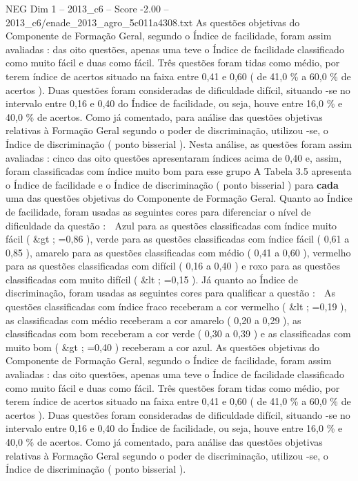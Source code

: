 \begin{textsample}{NEG Dim 1 – 2013\_c6 – Score -2.00 – 2013\_c6/enade\_2013\_agro\_5c011a4308.txt}
As questões objetivas do Componente de Formação Geral, segundo o Índice de facilidade, foram assim avaliadas : das oito questões, apenas uma teve o Índice de facilidade classificado como muito fácil e duas como fácil.
Três questões foram tidas como médio, por terem índice de acertos situado na faixa entre 0,41 e 0,60 ( de 41,0 \% a 60,0 \% de acertos ).
Duas questões foram consideradas de dificuldade difícil, situando -se no intervalo entre 0,16 e 0,40 do Índice de facilidade, ou seja, houve entre 16,0 \% e 40,0 \% de acertos.
Como já comentado, para análise das questões objetivas relativas à Formação Geral segundo o poder de discriminação, utilizou -se, o Índice de discriminação ( ponto bisserial ).
Nesta análise, as questões foram assim avaliadas : cinco das oito questões apresentaram índices acima de 0,40 e, assim, foram classificadas com índice muito bom para esse grupo A Tabela 3.5 apresenta o Índice de facilidade e o Índice de discriminação ( ponto bisserial ) para \textbf{cada} uma das questões objetivas do Componente de Formação Geral.
Quanto ao Índice de facilidade, foram usadas as seguintes cores para diferenciar o nível de dificuldade da questão :  Azul para as questões classificadas com índice muito fácil ( \&gt ; =0,86 ), verde para as questões classificadas com índice fácil ( 0,61 a 0,85 ), amarelo para as questões classificadas com médio ( 0,41 a 0,60 ), vermelho para as questões classificadas com difícil ( 0,16 a 0,40 ) e roxo para as questões classificadas com muito difícil ( \&lt ; =0,15 ).
Já quanto ao Índice de discriminação, foram usadas as seguintes cores para qualificar a questão :  As questões classificadas com índice fraco receberam a cor vermelho ( \&lt ; =0,19 ), as classificadas com médio receberam a cor amarelo ( 0,20 a 0,29 ), as classificadas com bom receberam a cor verde ( 0,30 a 0,39 ) e as classificadas com muito bom ( \&gt ; =0,40 ) receberam a cor azul.
As questões objetivas do Componente de Formação Geral, segundo o Índice de facilidade, foram assim avaliadas : das oito questões, apenas uma teve o Índice de facilidade classificado como muito fácil e duas como fácil.
Três questões foram tidas como médio, por terem índice de acertos situado na faixa entre 0,41 e 0,60 ( de 41,0 \% a 60,0 \% de acertos ).
Duas questões foram consideradas de dificuldade difícil, situando -se no intervalo entre 0,16 e 0,40 do Índice de facilidade, ou seja, houve entre 16,0 \% e 40,0 \% de acertos.
Como já comentado, para análise das questões objetivas relativas à Formação Geral segundo o poder de discriminação, utilizou -se, o Índice de discriminação ( ponto bisserial ).

\end{textsample}
